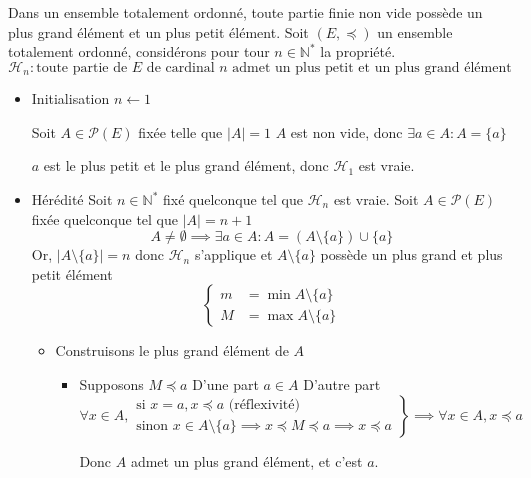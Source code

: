 \documentclass{article}
\renewenvironment{question_kholle}[2][ ]
{
	\subsection{\texorpdfstring{#2}{}}
	\notblank{#1}
	{
		\noindent #1
		\bigbreak
	}
	{}
	\begin{proof}
}
{
	\end{proof}
}
\begin{document}
\begin{question_kholle}[]{Dans un ensemble totalement ordonné, toute partie finie non vide possède un plus grand élément et un plus petit élément.}
  Soit $(E, \preccurlyeq)$ un ensemble totalement ordonné, considérons pour tour $n \in \mathbb{N}^{*}$ la propriété.
$$
  \mathcal{H}_{n} : \text{toute partie de }E \text{ de cardinal }n \text{ admet un plus petit et un plus grand élément}
$$
  \begin{itemize}[label=$\star$]
    \item Initialisation $n \leftarrow 1$
    
    Soit $A \in \mathcal{P}(E)$ fixée telle que $\lvert A \rvert = 1$
$A$ est non vide, donc $\exists a \in A : A = \{ a \}$
    
$a$ est le plus petit et le plus grand élément, donc $\mathcal{H}_{1}$ est vraie.
    
    \item Hérédité
    Soit $n \in \mathbb{N}^{*}$ fixé quelconque tel que $\mathcal{H}_{n}$ est vraie.
    Soit $A \in \mathcal{P}(E)$ fixée quelconque tel que $\lvert A \rvert = n+1$
$$
    A \neq \emptyset \implies \exists a \in A : A = (A \setminus \{ a \}) \cup \{ a \}
$$
    Or, $\lvert A \setminus \{ a \} \rvert = n$ donc $\mathcal{H}_{n}$ s'applique et $A \setminus \{ a \}$ possède un plus grand et plus petit élément
$$
    \left\{ \begin{array}{ll}
      m &= \min A \setminus \{ a \}  \\
      M &= \max A \setminus \{ a \}
    \end{array}\right.
$$
    \begin{itemize}[label=$\lozenge$]
      \item Construisons le plus grand élément de $A$
      \begin{itemize}[label=$\bullet$]
        \item Supposons $M \preccurlyeq a$
        D'une part $a \in A$
        D'autre part
        $$
        \forall x \in A, \left. \begin{array}{ll}
          \text{si }x = a, x \preccurlyeq a \text{ (réflexivité)} \\
          \text{sinon } x \in A \setminus \{ a \} \implies x \preccurlyeq M \preccurlyeq a \implies x \preccurlyeq a
        \end{array}\right\} \implies \forall x \in A, x \preccurlyeq a
        $$
        
        Donc $A$ admet un plus grand élément, et c'est $a$.
        

\end{itemize}
\end{itemize}
\end{itemize}
\end{question_kholle}
\end{document}
